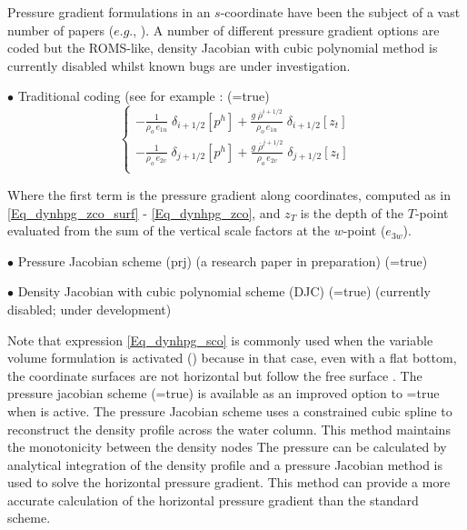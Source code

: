 \documentclass[NEMO_book]{subfiles}
\begin{document}
Pressure gradient formulations in an $s$-coordinate have been the subject of a vast 
number of papers ($e.g.$, \citet{Song1998, Shchepetkin_McWilliams_OM05}). 
A number of different pressure gradient options are coded but the ROMS-like, density Jacobian with 
cubic polynomial method is currently disabled whilst known bugs are under investigation.

$\bullet$ Traditional coding (see for example \citet{Madec_al_JPO96}: (=true)
\begin{equation} \label{Eq_dynhpg_sco}
\left\{ \begin{aligned}
 - \frac{1}    					{\rho_o \, e_{1u}} \;	\delta _{i+1/2} \left[  p^h  \right] 
+ \frac{g\; \overline {\rho}^{i+1/2}}	{\rho_o \, e_{1u}} \;	\delta _{i+1/2} \left[  z_t   \right]    \\
 - \frac{1}    					{\rho_o \, e_{2v}} \;	\delta _{j+1/2} \left[  p^h  \right]  
+ \frac{g\; \overline {\rho}^{j+1/2}}	{\rho_o \, e_{2v}} \;	\delta _{j+1/2} \left[  z_t   \right]    \\
\end{aligned} \right.
\end{equation} 

Where the first term is the pressure gradient along coordinates, computed as in 
\eqref{Eq_dynhpg_zco_surf} - \eqref{Eq_dynhpg_zco}, and $z_T$ is the depth of 
the $T$-point evaluated from the sum of the vertical scale factors at the $w$-point 
($e_{3w}$).
 
$\bullet$ Pressure Jacobian scheme (prj) (a research paper in preparation) (=true)

$\bullet$ Density Jacobian with cubic polynomial scheme (DJC) \citep{Shchepetkin_McWilliams_OM05} 
(=true) (currently disabled; under development)

Note that expression \eqref{Eq_dynhpg_sco} is commonly used when the variable volume formulation is
activated () because in that case, even with a flat bottom, the coordinate surfaces are not
horizontal but follow the free surface \citep{Levier2007}. The pressure jacobian scheme
(=true) is available as an improved option to =true when
 is active.  The pressure Jacobian scheme uses a constrained cubic spline to reconstruct
the density profile across the water column. This method maintains the monotonicity between the
density nodes  The pressure can be calculated by analytical integration of the density profile and a
pressure Jacobian method is used to solve the horizontal pressure gradient. This method can provide
a more accurate calculation of the horizontal pressure gradient than the standard scheme.
\end{document}

